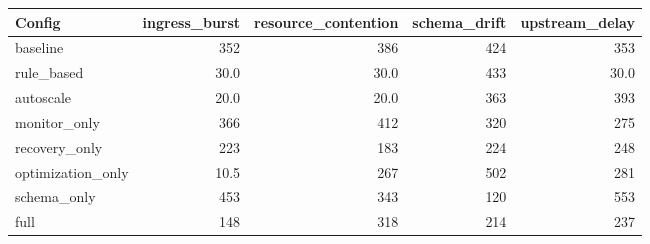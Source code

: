 \begin{tabular}{lrrrr}
\toprule
Config & ingress\_burst & resource\_contention & schema\_drift & upstream\_delay \\
\midrule
baseline & 352 & 386 & 424 & 353 \\
rule\_based & 30.0 & 30.0 & 433 & 30.0 \\
autoscale & 20.0 & 20.0 & 363 & 393 \\
monitor\_only & 366 & 412 & 320 & 275 \\
recovery\_only & 223 & 183 & 224 & 248 \\
optimization\_only & 10.5 & 267 & 502 & 281 \\
schema\_only & 453 & 343 & 120 & 553 \\
full & 148 & 318 & 214 & 237 \\
\bottomrule
\end{tabular}
